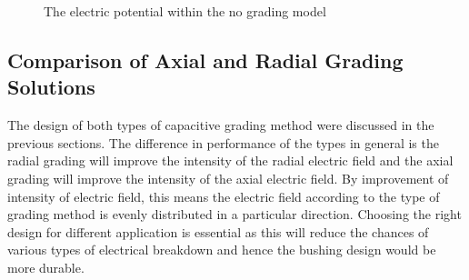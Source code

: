 \begin{figure}[!h]
  \centering
{} 
\caption{The electric potential within the no grading model}
\label{Figure:No_Grad_Failing_potential}
\end{figure}


\subsection{Comparison of Axial and Radial Grading Solutions}
The design of both types of capacitive grading method were discussed in the previous sections. The difference in performance of the types in general is the radial grading will improve the intensity of the radial electric field and the axial grading will improve the intensity of the axial electric field. By improvement of intensity of electric field, this means the electric field according to the type of grading method is evenly distributed in a particular direction. Choosing the right design for different application is essential as this will reduce the chances of various types of electrical breakdown and hence the bushing design would be more durable.

